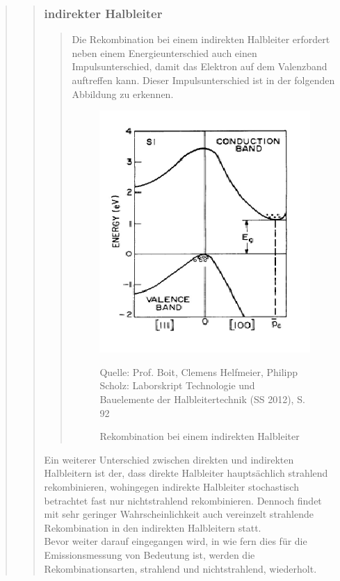 \begin{quote}
\begin{quote}
            \subsubsection{indirekter Halbleiter}
            \begin{quote}
            Die Rekombination bei einem indirekten Halbleiter erfordert neben
            einem Energieunterschied auch einen Impulsunterschied, damit das
            Elektron auf dem Valenzband auftreffen kann. Dieser
            Impulsunterschied ist in der folgenden Abbildung zu erkennen.

            \begin{figure}[H]
                    \centering
                        \includegraphics[scale=0.73, trim = 1cm 0cm 1.5cm 0cm,
                        clip]{./Emissionsbilder/restliches/indirekt.png}
                        \caption{Rekombination bei einem indirekten Halbleiter}

                                \begin{center}
                                    \small Quelle: Prof. Boit, Clemens Helfmeier, Philipp Scholz: Laborskript Technologie und Bauelemente der Halbleitertechnik (SS 2012), S. 92
                                \end{center}
                            \label{fig:./Emissionsbilder/restliches/indirekt.png}
            \end{figure}

            \end{quote}

            Ein weiterer Unterschied zwischen direkten und indirekten
            Halbleitern ist der, dass direkte Halbleiter hauptsächlich
            strahlend rekombinieren, wohingegen indirekte Halbleiter
            stochastisch betrachtet fast nur nichtstrahlend rekombinieren.
            Dennoch findet mit sehr geringer Wahrscheinlichkeit auch vereinzelt
            strahlende Rekombination in den indirekten Halbleitern statt.\\
            Bevor weiter darauf eingegangen wird, in wie fern dies für die
            Emissionsmessung von Bedeutung ist, werden die Rekombinationsarten,
            strahlend und nichtstrahlend, wiederholt.


\end{quote}
\end{quote}

